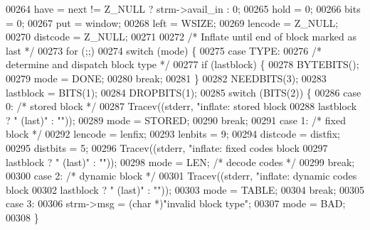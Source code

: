 \begin{DoxyCode}
{{{{00264     have = next != Z\_NULL ? strm->avail\_in : 0;
00265     hold = 0;
00266     bits = 0;
00267     put = window;
00268     left = WSIZE;
00269     lencode = Z\_NULL;
00270     distcode = Z\_NULL;
00271 
00272     \textcolor{comment}{/* Inflate until end of block marked as last */}
00273     for (;;)
00274         \textcolor{keywordflow}{switch} (mode) \{
00275         \textcolor{keywordflow}{case} TYPE:
00276             \textcolor{comment}{/* determine and dispatch block type */}
00277             \textcolor{keywordflow}{if} (lastblock) \{
00278                 BYTEBITS();
00279                 mode = DONE;
00280                 \textcolor{keywordflow}{break};
00281             \}
00282             NEEDBITS(3);
00283             lastblock = BITS(1);
00284             DROPBITS(1);
00285             \textcolor{keywordflow}{switch} (BITS(2)) \{
00286             \textcolor{keywordflow}{case} 0:                             \textcolor{comment}{/* stored block */}
00287                 Tracev((stderr, \textcolor{stringliteral}{"inflate:     stored block%
00288                         lastblock ? \textcolor{stringliteral}{" (last)"} : \textcolor{stringliteral}{""}));
00289                 mode = STORED;
00290                 \textcolor{keywordflow}{break};
00291             \textcolor{keywordflow}{case} 1:                             \textcolor{comment}{/* fixed block */}
00292                 lencode = lenfix;
00293                 lenbits = 9;
00294                 distcode = distfix;
00295                 distbits = 5;
00296                 Tracev((stderr, \textcolor{stringliteral}{"inflate:     fixed codes block%
00297                         lastblock ? \textcolor{stringliteral}{" (last)"} : \textcolor{stringliteral}{""}));
00298                 mode = LEN;                     \textcolor{comment}{/* decode codes */}
00299                 \textcolor{keywordflow}{break};
00300             \textcolor{keywordflow}{case} 2:                             \textcolor{comment}{/* dynamic block */}
00301                 Tracev((stderr, \textcolor{stringliteral}{"inflate:     dynamic codes block%
00302                         lastblock ? \textcolor{stringliteral}{" (last)"} : \textcolor{stringliteral}{""}));
00303                 mode = TABLE;
00304                 \textcolor{keywordflow}{break};
00305             \textcolor{keywordflow}{case} 3:
00306                 strm->msg = (\textcolor{keywordtype}{char} *)\textcolor{stringliteral}{"invalid block type"};
00307                 mode = BAD;
00308             \}
}}}}}}}
\end{DoxyCode}
